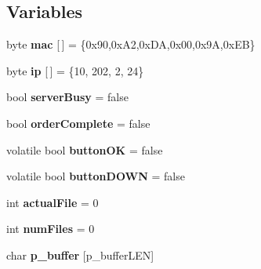 \subsection*{Variables}
\begin{DoxyCompactItemize}
\item 
\hypertarget{_c_n_c_interface_8ino_aea3f7775fecafb66a619eb2dcb0357bd}{byte {\bfseries mac} \mbox{[}$\,$\mbox{]} = \{0x90,0x\-A2,0x\-D\-A,0x00,0x9\-A,0x\-E\-B\}}\label{_c_n_c_interface_8ino_aea3f7775fecafb66a619eb2dcb0357bd}

\item 
\hypertarget{_c_n_c_interface_8ino_a0504bcde7a6b146902fa8b48b097bfe0}{byte {\bfseries ip} \mbox{[}$\,$\mbox{]} = \{10, 202, 2, 24\}}\label{_c_n_c_interface_8ino_a0504bcde7a6b146902fa8b48b097bfe0}

\item 
\hypertarget{_c_n_c_interface_8ino_a42d8433f7996a8b5f27034c805d75956}{bool {\bfseries server\-Busy} = false}\label{_c_n_c_interface_8ino_a42d8433f7996a8b5f27034c805d75956}

\item 
\hypertarget{_c_n_c_interface_8ino_afb86c898b965f4c891c0bc8aec3118a2}{bool {\bfseries order\-Complete} = false}\label{_c_n_c_interface_8ino_afb86c898b965f4c891c0bc8aec3118a2}

\item 
\hypertarget{_c_n_c_interface_8ino_a497c7f5ba17a701e2e0348698e631dd0}{volatile bool {\bfseries button\-O\-K} = false}\label{_c_n_c_interface_8ino_a497c7f5ba17a701e2e0348698e631dd0}

\item 
\hypertarget{_c_n_c_interface_8ino_a1236969b49bf4349f3f9528a7c513a82}{volatile bool {\bfseries button\-D\-O\-W\-N} = false}\label{_c_n_c_interface_8ino_a1236969b49bf4349f3f9528a7c513a82}

\item 
\hypertarget{_c_n_c_interface_8ino_a3888f3e3c08352588e7f94998eb820b4}{int {\bfseries actual\-File} = 0}\label{_c_n_c_interface_8ino_a3888f3e3c08352588e7f94998eb820b4}

\item 
\hypertarget{_c_n_c_interface_8ino_ac55fe61967bfc3ea816d6d4ed88a142c}{int {\bfseries num\-Files} = 0}\label{_c_n_c_interface_8ino_ac55fe61967bfc3ea816d6d4ed88a142c}

\item 
\hypertarget{_c_n_c_interface_8ino_a5d5c4dd2c6780efdfbd7a889c6f02fd1}{char {\bfseries p\-\_\-buffer} \mbox{[}p\-\_\-buffer\-L\-E\-N\mbox{]}}\label{_c_n_c_interface_8ino_a5d5c4dd2c6780efdfbd7a889c6f02fd1}


\end{DoxyCompactItemize}
